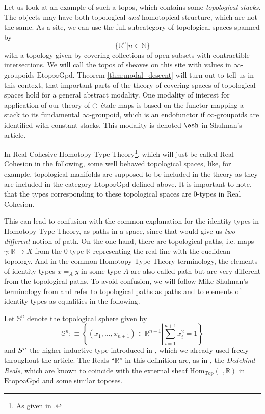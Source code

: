 \documentclass[9pt,twosided]{amsart}
\newcommand{\shape}{\ensuremath{\mathord{\raisebox{0.5pt}{\text{\rm\esh}}}}}
\newcommand{\bN}{\mathbb N}
\newcommand{\bR}{\mathbb R}
\newcommand{\bS}{\mathbb S}
\newcommand{\Spaces}{\ensuremath{\mathrm{Etop}\infty\mathrm{Gpd}}}
\begin{document}
Let us look at an example of such a topos, which contains some \emph{topological stacks}.
The objects may have both topological \emph{and} homotopical structure, which are not the same.
As a site, we can use the full subcategory of topological spaces spanned by
\[ \{ \bR^n \vert n\in\bN\}\]
with a topology given by covering collections of open subsets with contractible intersections.
We will call the topos of sheaves on this site with values in $\infty$-groupoids $\Spaces$. 
Theorem \ref{thm:modal_descent} will turn out to tell us in this context,
that important parts of the theory of covering spaces of topological spaces hold for a general abstract modality.
One modality of interest for application of our theory of ${\ocircle}$-étale maps is based on the functor mapping a stack to its fundamental $\infty$-groupoid,
which is an endofunctor if $\infty$-groupoids are identified with constant stacks. This modality is denoted $\shape$ in Shulman's article.

In Real Cohesive Homotopy Type Theory\footnote{As given in \cite{ShulmanRealCohesion}.},
which will just be called Real Cohesion in the following, 
some well behaved topological spaces, like, for example, topological manifolds
are supposed to be included in the theory as they are included in the category $\Spaces$ defined above.
It is important to note, that the types corresponding to these topological spaces
are 0-types in Real Cohesion.

This can lead to confusion with the common explanation for the identity types in Homotopy Type Theory,
as paths in a space, since that would give us \emph{two different} notion of path. 
On the one hand, there are topological paths, i.e. maps $\gamma:\bR\to X$ from the 0-type $\bR$ representing the real line with the euclidean topology.
And in the common Homotopy Type Theory terminology, the elements of identity types $x=_A y$ in some type $A$ are also called path but are very different from the topological paths. To avoid confusion, we will follow Mike Shulman's terminology from \cite{ShulmanRealCohesion} and refer to topological paths as paths and to elements of identity types as equalities in the following.

Let $\bS^{n}$ denote the topological sphere given by
\[ \bS^{n}:\equiv\left\{ (x_1,\dots,x_{n+1})\in\bR^{n+1}\left\vert \sum_{i=1}^{n+1}x_i^2=1\right.\right\}\]
and $S^{n}$ the higher inductive type introduced in \cite{UFP}, which we already used freely throughout the article.
The Reals ``$\bR$'' in this definition are, as in \cite{ShulmanRealCohesion}, the \emph{Dedekind Reals},
which are known to coincide with the external sheaf $\mathrm{Hom}_{\mathrm{Top}}(\_,\bR)$ in $\Spaces$ and some similar toposes.
\end{document}
